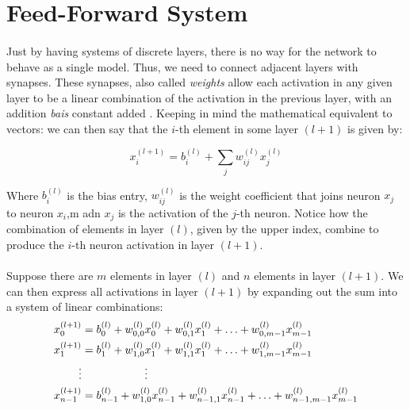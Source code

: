 \documentclass[12pt,letterpaper]{article}
\begin{document}
\section*{Feed-Forward System}

\paragraph*{}Just by having systems of discrete layers, there is no way for the network to behave as a single model. Thus, we need to connect adjacent layers with synapses. These synapses, also called \textit{weights} allow each activation in any given layer to be a linear combination of the activation in the previous layer, with an addition \textit{bais} constant added \cite{Geron,Loy}. Keeping in mind the mathematical equivalent to vectors: we can then say that the $i$-th element in some layer $(l+1)$ is given by:

\begin{equation}
\label{single element}
x^{(l+1)}_i = b^{(l)}_i + \sum_{j} w^{(l)}_{ij} x^{(l)}_j
\end{equation}

Where $b^{(l)}_i$ is the bias entry, $w^{(l)}_{ij}$ is the weight coefficient that joins neuron $x_j$ to neuron $x_i$,m adn $x_j$ is the activation of the $j$-th neuron.  Notice how the combination of elements in layer $(l)$, given by the upper index, combine to produce the $i$-th neuron activation in layer $(l+1)$. 

\paragraph*{}Suppose there are $m$ elements in layer $(l)$ and $n$ elements in layer $(l+1)$. We can then express all activations in layer $(l+1)$ by expanding out the sum into a system of linear combinations:
\begin{equation}
\begin{split}
\label{system elements}
x^{(l+1)}_0 &= b^{(l)}_0 + w^{(l)}_{0,0} x^{(l)}_0 + w^{(l)}_{0,1} x^{(l)}_1 + \hdots + w^{(l)}_{0,m-1} x^{(l)}_{m-1}  \\
x^{(l+1)}_1 &= b^{(l)}_1 + w^{(l)}_{1,0} x^{(l)}_1 + w^{(l)}_{1,1} x^{(l)}_1 + \hdots + w^{(l)}_{1,m-1} x^{(l)}_{m-1}  \\
\vdots & \text{\hspace{2cm}} \vdots \\
x^{(l+1)}_{n-1} &= b^{(l)}_{n-1} + w^{(l)}_{1,0} x^{(l)}_{n-1} + w^{(l)}_{n-1,1} x^{(l)}_{n-1} + \hdots + w^{(l)}_{n-1,m-1} x^{(l)}_{m-1}  \\
\end{split}
\end{equation}
\end{document}
